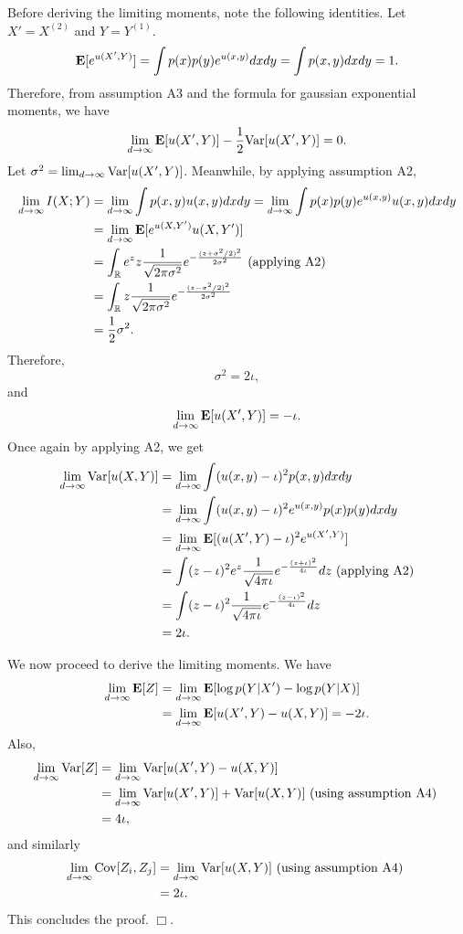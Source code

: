 \documentclass[12pt]{article}
\begin{document}
Before deriving the limiting moments, note the following identities.
Let $X' = X^{(2)}$ and $Y = Y^{(1)}$.
\[
\textbf{E}[e^{u(X', Y)}] = \int p(x) p(y) e^{u(x, y)} dx dy = \int p(x, y) dx dy = 1.
\]
Therefore, from assumption A3 and the formula for gaussian exponential
moments, we have
\[
\lim_{d \to \infty} \textbf{E}[u(X', Y)]-\frac{1}{2}\text{Var}[u(X', Y)] = 0.
\]
Let $\sigma^2 = \lim_{d \to \infty} \text{Var}[u(X', Y)]$.
Meanwhile, by applying assumption A2,
\begin{align*}
\lim_{d \to \infty} I(X; Y) &= \lim_{d \to \infty} \int p(x, y) u(x, y) dx dy 
= \lim_{d \to \infty} \int p(x) p(y) e^{u(x, y)} u(x, y) dx dy
\\&= \lim_{d \to \infty}  \textbf{E}[e^{u(X, Y')}u(X, Y')]
\\&= \int_{\mathbb{R}} e^z z \frac{1}{\sqrt{2\pi \sigma^2}} 
e^{-\frac{(z + \sigma^2/2)^2}{2\sigma^2}} \text{ (applying A2)}
\\&= \int_{\mathbb{R}} z \frac{1}{\sqrt{2\pi \sigma^2}} 
e^{-\frac{(z - \sigma^2/2)^2}{2\sigma^2}}
\\&= \frac{1}{2}\sigma^2.
\end{align*}
Therefore,
\[
\sigma^2 = 2\iota,
\]
and
\[
\lim_{d \to \infty} \textbf{E}[u(X', Y)] = -\iota.
\]
Once again by applying A2, we get
\begin{align*}
\lim_{d \to \infty} \text{Var}[u(X, Y)] 
&= \lim_{d \to \infty} \int (u(x, y) - \iota)^2 p(x, y) dx dy
\\&= \lim_{d \to \infty} \int (u(x, y) - \iota)^2 e^{u(x, y)} p(x) p(y) dx dy
\\&= \lim_{d \to \infty} \textbf{E}[(u(X', Y) - \iota)^2 e^{u(X', Y)}] 
\\&= \int (z - \iota)^2 e^z \frac{1}{\sqrt{4\pi\iota}} e^{-\frac{(z+\iota)^2}{4\iota}} dz \text{ (applying A2)}
\\&= \int (z - \iota)^2 \frac{1}{\sqrt{4\pi\iota}} e^{-\frac{(z-\iota)^2}{4\iota}} dz
\\&= 2\iota.
\end{align*}


We now proceed to derive the limiting moments.
We have
\begin{align*}
\lim_{d \to \infty} \textbf{E}[Z] 
&= \lim_{d \to \infty} \textbf{E}[ \log p(Y|X') - \log p(Y|X)]
\\&= \lim_{d \to \infty} \textbf{E}[ u(X', Y) - u(X, Y) ] = -2\iota.
\end{align*}
Also,
\begin{align*}
\lim_{d \to \infty} \text{Var}[Z]
 &= \lim_{d \to \infty} \text{Var}[ u(X', Y) - u(X, Y) ]
\\&= \lim_{d \to \infty} \text{Var}[ u(X', Y)] +\text{Var}[ u(X, Y) ]\text{ (using assumption A4) }
\\&= 4\iota,
\end{align*}
and similarly
\begin{align*}
\lim_{d \to \infty} \text{Cov}[Z_i, Z_j]
&= \lim_{d \to \infty} \text{Var}[ u(X, Y)]\text{ (using assumption A4) }
\\&= 2\iota.
\end{align*}
This concludes the proof. $\Box$.
\end{document}
